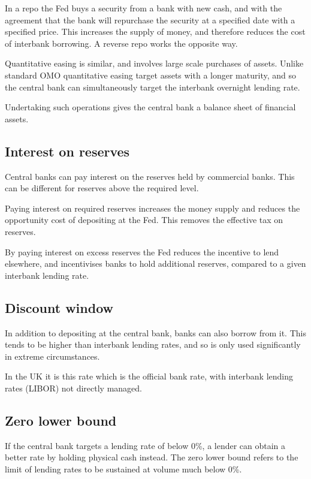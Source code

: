 In a repo the Fed buys a security from a bank with new cash, and with the agreement that the bank will repurchase the security at a specified date with a specified price. This increases the supply of money, and therefore reduces the cost of interbank borrowing. A reverse repo works the opposite way.

Quantitative easing is similar, and involves large scale purchases of assets. Unlike standard OMO quantitative easing target assets with a longer maturity, and so the central bank can simultaneously target the interbank overnight lending rate.

Undertaking such operations gives the central bank a balance sheet of financial assets.

\subsection{Interest on reserves}

Central banks can pay interest on the reserves held by commercial banks. This can be different for reserves above the required level.

Paying interest on required reserves increases the money supply and reduces the opportunity cost of depositing at the Fed. This removes the effective tax on reserves.

By paying interest on excess reserves the Fed reduces the incentive to lend elsewhere, and incentivises banks to hold additional reserves, compared to a given interbank lending rate.

\subsection{Discount window}

In addition to depositing at the central bank, banks can also borrow from it. This tends to be higher than interbank lending rates, and so is only used significantly in extreme circumstances.

In the UK it is this rate which is the official bank rate, with interbank lending rates (LIBOR) not directly managed.

\subsection{Zero lower bound}

If the central bank targets a lending rate of below 0\%, a lender can obtain a better rate by holding physical cash instead. The zero lower bound refers to the limit of lending rates to be sustained at volume much below 0\%.


